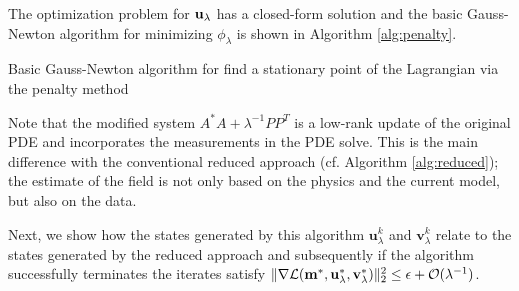 \documentclass{iopart}
\begin{document}
The optimization problem for $\mathbf{u}_{\lambda}$ has a closed-form solution and 
the basic Gauss-Newton algorithm for minimizing $\phi_{\lambda}$ is shown in Algorithm \ref{alg:penalty}.

\begin{algorithm}
\caption{Basic Gauss-Newton algorithm for find a stationary point of the Lagrangian via the penalty method}
\label{alg:penalty}
\begin{algorithmic}
\REPEAT
{}
\end{algorithmic}
\end{algorithm}

Note that the modified system $A^*A + \lambda^{-1}PP^T$ is a low-rank update of the original PDE and
incorporates the measurements in the PDE solve. This is the main difference with the conventional reduced approach (cf. Algorithm \ref{alg:reduced}); 
the estimate of the field is not only based on the physics and the current model, but also on the data.

Next, we show how the states generated by this algorithm $\mathbf{u}^k_{\lambda}$ and $\mathbf{v}^k_{\lambda}$ 
relate to the states generated by the reduced approach and subsequently if the algorithm successfully terminates
the iterates satisfy $\|\nabla\mathcal{L}(\mathbf{m}^*, \mathbf{u}^*_{\lambda}, \mathbf{v}^*_{\lambda})\|_2^2 \leq \epsilon + \mathcal{O}(\lambda^{-1})$.
\end{document}
